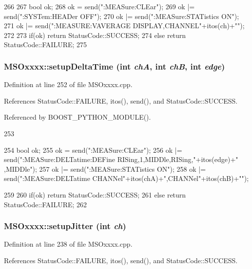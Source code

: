 \begin{DoxyCode}
266 {
267     bool ok;
268     ok  = send(":MEASure:CLEar\n");
269     ok |=   send(":SYSTem:HEADer OFF\n");    
270     ok |=   send(":MEASure:STATistics ON\n");
271     ok |=   send(":MEASURE:VAVERAGE DISPLAY,CHANNEL"+itos(ch)+"\n");
272 
273     if(ok)  return StatusCode::SUCCESS;
274     else        return StatusCode::FAILURE; 
275 }
\end{DoxyCode}
\hypertarget{classMSOxxxx_abbbebb3e4649c866bcdd853627f12b5d}{
\subsubsection[{setupDeltaTime}]{ MSOxxxx::setupDeltaTime (int {\em chA}, \/  int {\em chB}, \/  int {\em edge})}}
\label{classMSOxxxx_abbbebb3e4649c866bcdd853627f12b5d}


Definition at line 252 of file MSOxxxx.cpp.

References StatusCode::FAILURE, itos(), send(), and StatusCode::SUCCESS.

Referenced by BOOST\_\-PYTHON\_\-MODULE().


\begin{DoxyCode}
253 { 
254     bool ok;
255     ok  = send(":MEASure:CLEar\n");
256     ok |=   send(":MEASure:DELTatime:DEFine RISing,1,MIDDle,RISing,"+itos(edge)+"
      ,MIDDle\n");
257     ok |= send(":MEASure:STATistics ON\n");
258     ok |= send(":MEASure:DELTatime CHANNel"+itos(chA)+",CHANNel"+itos(chB)+"\n");
      
259 
260     if(ok)  return StatusCode::SUCCESS;
261     else        return StatusCode::FAILURE; 
262 }
\end{DoxyCode}
\hypertarget{classMSOxxxx_a829d87b0aa03840ebfe0a44e560c7f63}{
\subsubsection[{setupJitter}]{ MSOxxxx::setupJitter (int {\em ch})}}
\label{classMSOxxxx_a829d87b0aa03840ebfe0a44e560c7f63}


Definition at line 238 of file MSOxxxx.cpp.

References StatusCode::FAILURE, itos(), send(), and StatusCode::SUCCESS.

